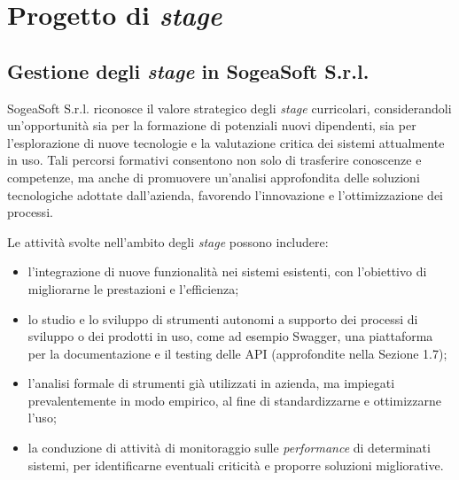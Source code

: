 \chapter{Progetto di \textit{stage}}
    \section{Gestione degli \textit{stage} in SogeaSoft S.r.l.}
    SogeaSoft S.r.l. riconosce il valore strategico degli \textit{stage} curricolari, considerandoli un'opportunità sia per la formazione di potenziali nuovi dipendenti, sia per l'esplorazione di nuove tecnologie e la valutazione critica dei sistemi attualmente in uso. Tali percorsi formativi consentono non solo di trasferire conoscenze e competenze, ma anche di promuovere un'analisi approfondita delle soluzioni tecnologiche adottate dall'azienda, favorendo l'innovazione e l'ottimizzazione dei processi.  

    \vspace{0.2 em}
    \noindent Le attività svolte nell'ambito degli \textit{stage} possono includere: 
    \begin{itemize}
        \item l'integrazione di nuove funzionalità nei sistemi esistenti, con l'obiettivo di migliorarne le prestazioni e l'efficienza;
        \item lo studio e lo sviluppo di strumenti autonomi a supporto dei processi di sviluppo o dei prodotti in uso, come ad esempio Swagger, una piattaforma per la documentazione e il testing delle API (approfondite nella Sezione 1.7);  
        \item l'analisi formale di strumenti già utilizzati in azienda, ma impiegati prevalentemente in modo empirico, al fine di standardizzarne e ottimizzarne l’uso;  
        \item la conduzione di attività di monitoraggio sulle \textit{performance} di determinati sistemi, per identificarne eventuali criticità e proporre soluzioni migliorative.  
    \end{itemize}

